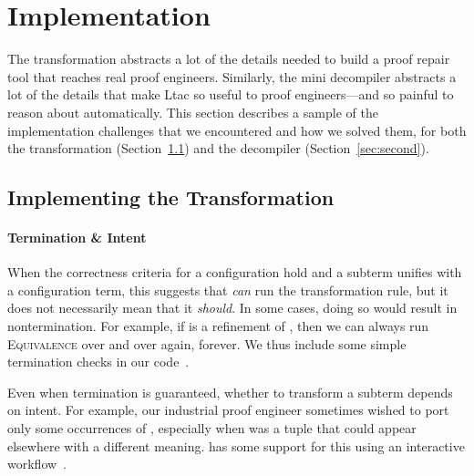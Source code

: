 \section{Implementation}
\label{sec:impl}

The transformation abstracts a lot of the details needed to build a proof repair tool that reaches real proof engineers.
Similarly, the mini decompiler abstracts a lot of the details that make Ltac so useful to proof engineers---and so painful to 
reason about automatically.
This section describes a sample of the implementation challenges that we encountered and how we solved them,
for both the transformation (Section~\ref{sec:implementation}) and the decompiler (Section~\ref{sec:second}).

\subsection{Implementing the Transformation}
\label{sec:implementation}

\paragraph{Termination \& Intent}
When the correctness criteria for a configuration hold and a subterm unifies with a configuration term, this suggests that \toolname \textit{can}
run the transformation rule, but it does not necessarily mean that it \textit{should}.
In some cases, doing so would result in nontermination.
For example, if \B is a refinement of \A, then we can always run \textsc{Equivalence}
over and over again, forever.
We thus include some simple termination checks in our code~. %

Even when termination is guaranteed, whether to transform a subterm depends on intent.
For example, our industrial proof engineer sometimes wished to port only some occurrences of \A,
especially when \A was a tuple that could appear elsewhere
with a different meaning.
\toolname has some support for this using an interactive workflow~. %

